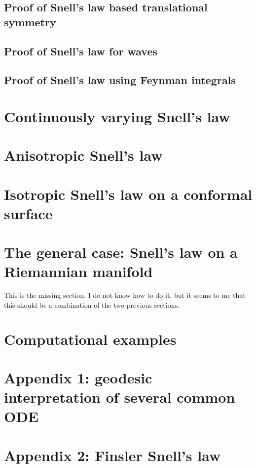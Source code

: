 \subsection{Proof of Snell's law based translational symmetry}

\subsection{Proof of Snell's law for waves}

\subsection{Proof of Snell's law using Feynman integrals}


\section{Continuously varying Snell's law}

\section{Anisotropic Snell's law}

\section{Isotropic Snell's law on a conformal surface}

\section{The general case: Snell's law on a Riemannian manifold}

This is the missing section.  I do not know how to do it, but it seems to me
that this should be a combination of the two previous sections.

\section{Computational examples}

\section{Appendix 1: geodesic interpretation of several common ODE}

\section{Appendix 2: Finsler Snell's law}


